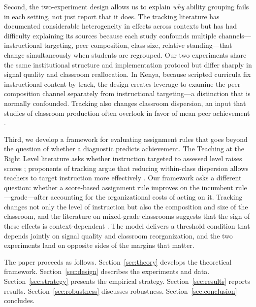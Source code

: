 \documentclass[11pt]{article}
\begin{document}
Second, the two-experiment design allows us to explain \emph{why} ability grouping fails in each setting, not just report that it does. The tracking literature has documented considerable heterogeneity in effects across contexts \citep{betts:2011,card2016can,vardardottir2013peer} but has had difficulty explaining its sources because each study confounds multiple channels---instructional targeting, peer composition, class size, relative standing---that change simultaneously when students are regrouped. Our two experiments share the same institutional structure and implementation protocol but differ sharply in signal quality and classroom reallocation. In Kenya, because scripted curricula fix instructional content by track, the design creates leverage to examine the peer-composition channel separately from instructional targeting---a distinction that is normally confounded. Tracking also changes classroom dispersion, an input that studies of classroom production often overlook in favor of mean peer achievement \citep{rjosk2022dispersion,vigdor2007peer,duflo2011peer}.

Third, we develop a framework for evaluating assignment rules that goes beyond the question of whether a diagnostic predicts achievement. The Teaching at the Right Level literature asks whether instruction targeted to assessed level raises scores \citep{banerjee2017proof,duflo2020experimental}; proponents of tracking argue that reducing within-class dispersion allows teachers to target instruction more effectively \citep{duflo2011peer}. Our framework asks a different question: whether a score-based assignment rule improves on the incumbent rule---grade---after accounting for the organizational costs of acting on it. Tracking changes not only the level of instruction but also the composition and size of the classroom, and the literature on mixed-grade classrooms suggests that the sign of these effects is context-dependent \citep{sims2008strategic,leuven2011classroom}. The model delivers a threshold condition that depends jointly on signal quality and classroom reorganization, and the two experiments land on opposite sides of the margins that matter.

The paper proceeds as follows. Section~\ref{sec:theory} develops the theoretical framework. Section~\ref{sec:design} describes the experiments and data. Section~\ref{sec:strategy} presents the empirical strategy. Section~\ref{sec:results} reports results. Section~\ref{sec:robustness} discusses robustness. Section~\ref{sec:conclusion} concludes.
\end{document}
